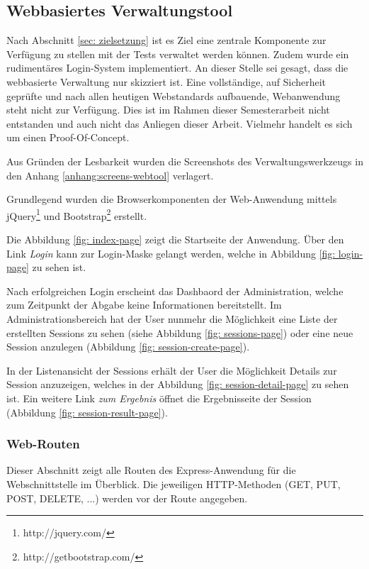 \subsection{Webbasiertes Verwaltungstool}
\label{sec:web_verwaltung}
Nach Abschnitt \ref{sec: zielsetzung} ist es Ziel eine zentrale Komponente zur Verfügung zu stellen mit der Tests verwaltet werden können. 
Zudem wurde ein rudimentäres Login-System implementiert. 
An dieser Stelle sei gesagt, dass die webbasierte Verwaltung nur skizziert ist. 
Eine vollständige, auf Sicherheit geprüfte und nach allen heutigen Webstandards aufbauende, Webanwendung steht nicht zur Verfügung. 
Dies ist im Rahmen dieser Semesterarbeit nicht entstanden und auch nicht das Anliegen dieser Arbeit. 
Vielmehr handelt es sich um einen Proof-Of-Concept. 

Aus Gründen der Lesbarkeit wurden die Screenshots des Verwaltungswerkzeugs in den Anhang \ref{anhang:screens-webtool} verlagert. 

Grundlegend wurden die Browserkomponenten der Web-Anwendung mittels jQuery\footnote{http://jquery.com/} und Bootstrap\footnote{http://getbootstrap.com/} erstellt.

Die Abbildung \ref{fig: index-page} zeigt die Startseite der Anwendung. 
Über den Link \emph{Login} kann zur Login-Maske gelangt werden, welche in Abbildung \ref{fig: login-page} zu sehen ist. 

Nach erfolgreichen Login erscheint das Dashbaord der Administration, welche zum Zeitpunkt der Abgabe keine Informationen bereitstellt. 
Im Administrationsbereich hat der User nunmehr die Möglichkeit eine Liste der erstellten Sessions zu sehen (siehe Abbildung \ref{fig: sessions-page}) oder eine neue Session anzulegen (Abbildung \ref{fig: session-create-page}). 

In der Listenansicht der Sessions erhält der User die Möglichkeit Details zur Session anzuzeigen, welches in der Abbildung \ref{fig: session-detail-page} zu sehen ist. 
Ein weitere Link \emph{zum Ergebnis} öffnet die Ergebnisseite der Session (Abbildung \ref{fig: session-result-page}).

\subsubsection{Web-Routen}

Dieser Abschnitt zeigt alle Routen des Express-Anwendung für die Webschnittstelle im Überblick. 
Die jeweiligen \ac{HTTP}-Methoden (GET, PUT, POST, DELETE, ...) werden vor der Route angegeben.

